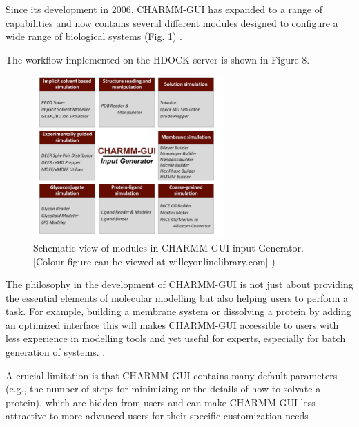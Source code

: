\documentclass[11pt, letterpaper, english]{article}
\begin{document}
        
        \par Since its development in 2006, CHARMM-GUI has expanded to a range of capabilities and now contains several different modules designed to configure a wide range of biological systems (Fig. 1) \cite{Jo_2017}.
        
        \par The workflow implemented on the HDOCK server is shown in Figure 8.
        \begin{figure}
	    \centering
		\caption{Schematic view of modules in CHARMM-GUI input Generator. [Colour figure can be viewed at willeyonlinelibrary.com]\cite{Jo_2017} )}
		\includegraphics[width=0.65\textwidth]{images/Imagen 1.png}
	\end{figure}\textbf{}
        
        \par The philosophy in the development of CHARMM-GUI is not just about providing the essential elements of molecular modelling but also helping users to perform a task. For example, building a membrane system or dissolving a protein by adding an optimized interface this will makes CHARMM-GUI accessible to users with less experience in modelling tools and yet useful for experts, especially for batch generation of systems. \cite{Jo_2017}.
        
       \par A crucial limitation is that CHARMM-GUI contains many default parameters (e.g., the number of steps for minimizing or the details of how to solvate a protein), which are hidden from users and can make CHARMM-GUI less attractive to more advanced users for their specific customization needs \cite{Jo_2017}. 
\end{document}
